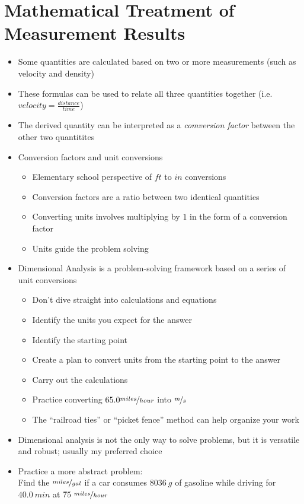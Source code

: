 \documentclass[12pt, openany, letterpaper]{memoir}
\begin{document}
\section{Mathematical Treatment of Measurement Results}
\begin{itemize}
  \item Some quantities are calculated based on two or more measurements (such as velocity and density)
  \item These formulas can be used to relate all three quantities together (i.e. $velocity = \frac{distance}{time}$)
  \item The derived quantity can be interpreted as a \emph{comversion factor} between the other two quantitites
  \item Conversion factors and unit conversions 
  \begin{itemize}
    \item Elementary school perspective of $ft$ to $in$ conversions
    \item Conversion factors are a ratio between two identical quantities
    \item Converting units involves multiplying by $1$ in the form of a conversion factor
    \item Units guide the problem solving
  \end{itemize}
  \item Dimensional Analysis is a problem-solving framework based on a series of unit conversions
  \begin{itemize}
    \item Don't dive straight into calculations and equations
    \item Identify the units you expect for the answer
    \item Identify the starting point
    \item Create a plan to convert units from the starting point to the answer
    \item Carry out the calculations
    \item Practice converting $65.0\nicefrac{miles}{hour}$ into $\nicefrac{m}{s}$
    \item The ``railroad ties'' or ``picket fence'' method can help organize your work
  \end{itemize}
  \item Dimensional analysis is not the only way to solve problems, but it is versatile and robust; usually my preferred choice
  \item Practice a more abstract problem:
    \\ Find the $\nicefrac{miles}{gal}$ if a car consumes $8036~g$ of gasoline while driving for $40.0~min$ at $75~\nicefrac{miles}{hour}$
\end{itemize}
\end{document}
